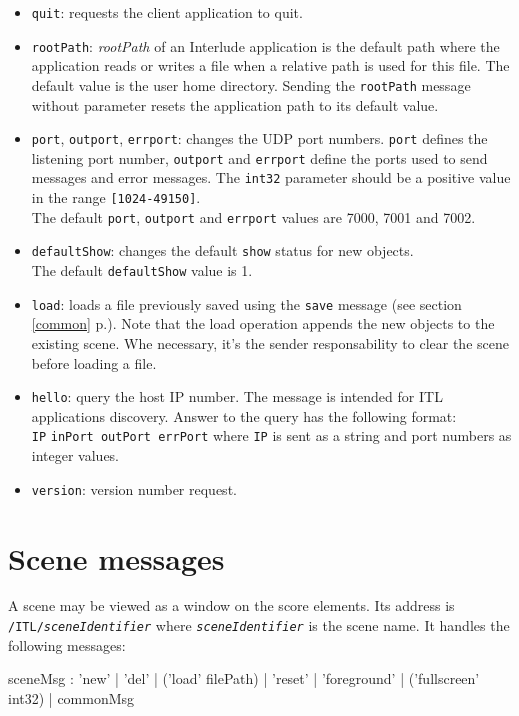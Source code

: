 \documentclass[a4paper,twoside]{report}
\newcommand{\toplevel}[1]	{\chapter{#1}}
\newcommand{\fullref}[1]	{\ref{#1} p.\pageref{#1}}
\newcommand{\OSC}[1]		{\texttt{#1}}
\newcommand{\values}[1]	{\texttt{#1}}
\newcommand{\example}		{\hspace*{1cm}}
\begin{document}
\begin{itemize}
\item \OSC{quit}: requests the client application to quit.

\item \OSC{rootPath}: \emph{rootPath} of an Interlude application is the default path where the application reads or writes a file when a relative path is used for this file. The default value is the user home directory. Sending the \OSC{rootPath} message without parameter resets the application path to its default value.

\item \OSC{port}, \OSC{outport}, \OSC{errport}: changes the UDP port numbers. \OSC{port} defines the listening port number, \OSC{outport} and \OSC{errport} define the ports used to send messages and error messages. The \OSC{int32} parameter should be a positive value in the range \values{[1024-49150]}. \\
The default \OSC{port}, \OSC{outport} and \OSC{errport} values are 7000, 7001 and 7002.

\item \OSC{defaultShow}: changes the default \OSC{show} status for new objects. \\
The default \OSC{defaultShow} value is 1.

\item \OSC{load}: loads a file previously saved using the \OSC{save} message (see section \fullref{common}). Note that the load operation appends the new objects to the existing scene. Whe necessary, it's the sender responsability to clear the scene before loading a file.

\item \OSC{hello}: query the host IP number. The message is intended for ITL applications discovery. Answer to the query has the following format: \\
\example \OSC{IP} \OSC{inPort outPort errPort} where \OSC{IP} is sent as a string and port numbers as integer values.

\item \OSC{version}: version number request.
\end{itemize}

\toplevel{Scene messages}
\label{scene}
A scene may be viewed as a window on the score elements. Its address is \OSC{/ITL/\textit{sceneIdentifier}} where \OSC{\textit{sceneIdentifier}} is the scene name. It handles the following messages:
\begin{rail}
sceneMsg :  'new'
			| 'del'
			| ('load' filePath)
			| 'reset'
			| 'foreground'
			| ('fullscreen' int32)
			| commonMsg
\end{rail}
\end{document}
